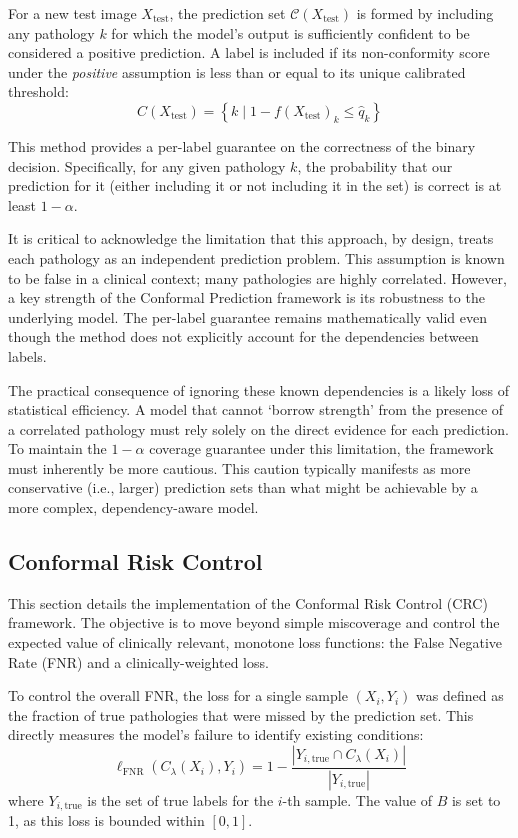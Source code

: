 For a new test image \(X_{\text{test}}\),
the prediction set \(\mathcal{C}(X_{\text{test}})\) is formed by including any pathology \(k\)
for which the model's output is sufficiently confident to be considered a positive prediction.
A label is included if its non-conformity score
under the \emph{positive} assumption is less than or equal to its unique calibrated threshold:
\[
    C(X_{\text{test}}) = \left\{ k \mid 1 - f(X_{\text{test}})_k \leq \hat{q}_k \right\}
\]

This method provides a per-label guarantee on the correctness of the binary decision.
Specifically, for any given pathology \(k\), the probability that our prediction for it
(either including it or not including it in the set) is correct is at least $1-\alpha$.

It is critical to acknowledge the limitation that this approach, by design,
treats each pathology as an independent prediction problem.
This assumption is known to be false in a clinical context;
many pathologies are highly correlated.
However, a key strength of the Conformal Prediction framework is
its robustness to the underlying model.
The per-label guarantee remains mathematically valid
even though the method does not explicitly account for the dependencies between labels.

The practical consequence of ignoring these known dependencies
is a likely loss of statistical efficiency.
A model that cannot `borrow strength' from the presence of a correlated pathology
must rely solely on the direct evidence for each prediction.
To maintain the \(1-\alpha\) coverage guarantee under this limitation,
the framework must inherently be more cautious.
This caution typically manifests as more conservative (i.e., larger) prediction sets
than what might be achievable by a more complex, dependency-aware model.

\subsection{Conformal Risk Control}

This section details the implementation of the Conformal Risk Control (CRC) framework.
The objective is to move beyond simple miscoverage
and control the expected value of clinically relevant, monotone loss functions:
the False Negative Rate (FNR) and a clinically-weighted loss.

To control the overall FNR, the loss for a single sample \((X_i, Y_i)\)
was defined as the fraction of true pathologies that were missed by the prediction set.
This directly measures the model's failure to identify existing conditions:
\begin{equation}
    \ell_{\text{FNR}}(C_\lambda(X_i), Y_i) = 1 - \frac{|Y_{i,\text{true}} \cap C_\lambda(X_i)|}{|Y_{i,\text{true}}|}
    \label{eq:fnr_loss}
\end{equation}
where \(Y_{i,\text{true}}\) is the set of true labels for the \(i\)-th sample.
The value of \(B\) is set to 1, as this loss is bounded within \([0, 1]\).

